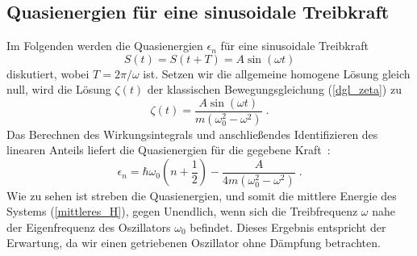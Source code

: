       \subsection{Quasienergien für eine sinusoidale Treibkraft}
      \label{epsilon_sinuskraft}
        Im Folgenden werden die Quasienergien $\epsilon_n$ für eine sinusoidale Treibkraft %
        \begin{equation}
          S(t) = S(t+T) = A\sin(\omega t)
        \end{equation}
        diskutiert, wobei $T=2\pi/\omega$ ist.
        Setzen wir die allgemeine homogene Lösung gleich null, wird die Lösung $\zeta(t)$ der klassischen Bewegungsgleichung (\ref{dgl_zeta}) zu~\cite{mads}
        \begin{equation}
          \zeta(t) = \frac{A\sin(\omega t)}{m(\omega_0^2 - \omega^2)} \;
          \label{zeta_sinuskraft}.
        \end{equation}
        Das Berechnen des Wirkungsintegrals und anschließendes Identifizieren des linearen Anteils liefert die Quasienergien für die gegebene Kraft~\cite{mads}:
        \begin{equation}
          \epsilon_n  = \hbar \omega_0\left(n+\frac{1}{2}\right) - \frac{A}{4m(\omega_0^2-\omega^2)} \;.
        \end{equation}
        Wie zu sehen ist streben die Quasienergien, und somit die mittlere Energie des Systems (\ref{mittleres_H}), gegen Unendlich, wenn sich die Treibfrequenz $\omega$ nahe der Eigenfrequenz des Oszillators $\omega_0 $ befindet.
        Dieses Ergebnis entspricht der Erwartung, da wir einen getriebenen Oszillator ohne Dämpfung betrachten.


